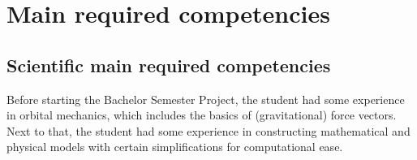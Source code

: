 \documentclass[conference,compsoc]{IEEEtran}
\begin{document}

%
\IEEEpeerreviewmaketitle







\section{Main required competencies } 


\subsection{Scientific main required competencies }
Before starting the Bachelor Semester Project, the student had some experience in orbital mechanics, which includes the basics of (gravitational) force vectors. \\
Next to that, the student had some experience in constructing mathematical and physical models with certain simplifications for computational ease.
\end{document}
